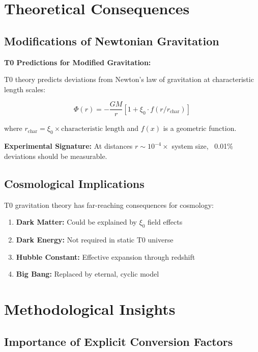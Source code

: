 \documentclass[12pt,a4paper]{article}
\begin{document}
	\section{Theoretical Consequences}
	
	\subsection{Modifications of Newtonian Gravitation}
	
	\begin{warning}
		\textbf{T0 Predictions for Modified Gravitation:}
		
		T0 theory predicts deviations from Newton's law of gravitation at characteristic length scales:
		
		\begin{equation}
			\Phi(r) = -\frac{GM}{r} \left[1 + \xi_0 \cdot f(r/r_{\text{char}})\right]
		\end{equation}
		
		where $r_{\text{char}} = \xi_0 \times \text{characteristic length}$ and $f(x)$ is a geometric function.
		
		\textbf{Experimental Signature:} At distances $r \sim 10^{-4} \times$ system size, ~0.01\% deviations should be measurable.
	\end{warning}
	
	\subsection{Cosmological Implications}
	
	T0 gravitation theory has far-reaching consequences for cosmology:
	
	\begin{enumerate}
		\item \textbf{Dark Matter:} Could be explained by $\xi_0$ field effects
		\item \textbf{Dark Energy:} Not required in static T0 universe
		\item \textbf{Hubble Constant:} Effective expansion through redshift
		\item \textbf{Big Bang:} Replaced by eternal, cyclic model
	\end{enumerate}
	
	\section{Methodological Insights}
	
	\subsection{Importance of Explicit Conversion Factors}
	
\end{document}
